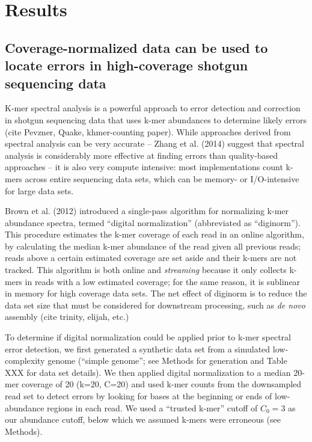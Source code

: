 



\section{Results}

\subsection{Coverage-normalized data can be used to locate
errors in high-coverage shotgun sequencing data}

K-mer spectral analysis is a powerful approach to error detection and
correction in shotgun sequencing data that uses k-mer abundances to
determine likely errors (cite Pevzner, Quake, khmer-counting paper).
While approaches derived from spectral analysis can be very accurate
-- Zhang et al. (2014) suggest that spectral analysis is considerably
more effective at finding errors than quality-based approaches -- it
is also very compute intensive: most implementations count k-mers
across entire sequencing data sets, which can be memory- or
I/O-intensive for large data sets.

Brown et al. (2012) introduced a single-pass algorithm for normalizing
k-mer abundance spectra, termed ``digital normalization'' (abbreviated
as ``diginorm'').  This procedure estimates the k-mer coverage of each
read in an online algorithm, by calculating the median k-mer abundance
of the read given all previous reads; reads above a certain estimated
coverage are set aside and their k-mers are not tracked.  This
algorithm is both online and {\em streaming} because it only collects
k-mers in reads with a low estimated coverage; for the same reason, it
is sublinear in memory for high coverage data sets.  The net effect of
diginorm is to reduce the data set size that must be considered for
downstream processing, such as {\em de novo} assembly (cite trinity,
elijah, etc.)

To determine if digital normalization could be applied prior to k-mer
spectral error detection, we first generated a synthetic data set from
a simulated low-complexity genome (``simple genome''; see Methods for
generation and Table XXX for data set details).  We then applied
digital normalization to a median 20-mer coverage of 20 (k=20, C=20)
and used k-mer counts from the downsampled read set to detect errors
by looking for bases at the beginning or ends of low-abundance regions
in each read. We used a ``trusted k-mer'' cutoff of $C_0 = 3$ as our
abundance cutoff, below which we assumed k-mers were erroneous (see Methods).

